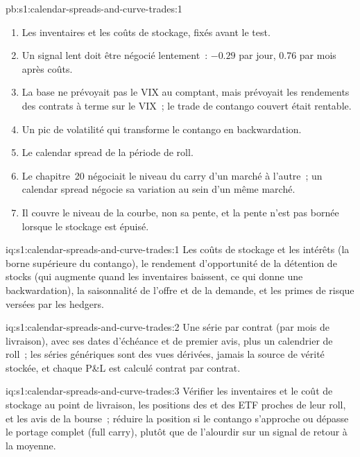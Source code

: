 \begin{solution}{pb:s1:calendar-spreads-and-curve-trades:1}
\begin{enumerate}
\item Les inventaires et les coûts de stockage, fixés avant le test.
\item Un signal lent doit être négocié lentement~: $-0.29$ par jour, 0.76 par mois après coûts.
\item La base ne prévoyait pas le VIX au comptant, mais prévoyait les rendements des contrats à terme sur le VIX~; le trade de contango couvert était rentable.
\item Un pic de volatilité qui transforme le contango en backwardation.
\item Le calendar spread de la période de roll.
\item Le chapitre~20 négociait le niveau du carry d'un marché à l'autre~; un calendar spread négocie sa variation au sein d'un même marché.
\item Il couvre le niveau de la courbe, non sa pente, et la pente n'est pas bornée lorsque le stockage est épuisé.
\end{enumerate}
\end{solution}

\begin{solution}{iq:s1:calendar-spreads-and-curve-trades:1}
Les coûts de stockage et les intérêts (la borne supérieure du contango), le rendement d'opportunité de la détention de stocks (qui augmente quand les inventaires baissent, ce qui donne
une backwardation), la saisonnalité de l'offre et de la demande, et les primes de risque versées par les hedgers.
\end{solution}

\begin{solution}{iq:s1:calendar-spreads-and-curve-trades:2}
Une série par contrat (par mois de livraison), avec ses dates d'échéance et de premier avis, plus un calendrier de roll~; les séries génériques sont des vues dérivées, jamais la
source de vérité stockée, et chaque P\&L est calculé contrat par contrat.
\end{solution}

\begin{solution}{iq:s1:calendar-spreads-and-curve-trades:3}
Vérifier les inventaires et le coût de stockage au point de livraison, les positions des  et des ETF proches de leur roll, et les avis de la bourse~; réduire
la position si le contango s'approche ou dépasse le portage complet (full carry), plutôt que de l'alourdir sur un signal de retour à la moyenne.
\end{solution}

